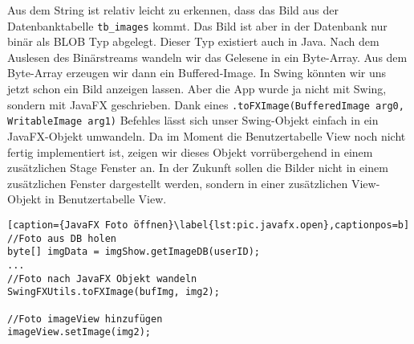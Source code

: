Aus dem String ist relativ leicht zu erkennen, dass das Bild aus der Datenbanktabelle \texttt{tb\_images} kommt. Das Bild ist aber in der Datenbank nur binär als BLOB Typ abgelegt. Dieser Typ existiert auch in Java. Nach dem Auslesen des Binärstreams wandeln wir das Gelesene in ein Byte-Array. Aus dem Byte-Array erzeugen wir dann ein Buffered-Image. In Swing könnten wir uns jetzt schon ein Bild anzeigen lassen. Aber die App wurde ja nicht mit Swing, sondern mit JavaFX geschrieben. Dank eines \texttt{.toFXImage(BufferedImage arg0, WritableImage arg1)} Befehles lässt sich unser Swing-Objekt einfach in ein JavaFX-Objekt umwandeln. Da im Moment die Benutzertabelle View noch nicht fertig implementiert ist, zeigen wir dieses Objekt vorrübergehend in einem zusätzlichen Stage Fenster an. In der Zukunft sollen die Bilder nicht in einem zusätzlichen Fenster dargestellt werden, sondern in einer zusätzlichen View-Objekt in Benutzertabelle View. %
\begin{lstlisting}[caption={JavaFX Foto öffnen}\label{lst:pic.javafx.open},captionpos=b]
//Foto aus DB holen
byte[] imgData = imgShow.getImageDB(userID);
...
//Foto nach JavaFX Objekt wandeln
SwingFXUtils.toFXImage(bufImg, img2);

//Foto imageView hinzufügen
imageView.setImage(img2);
\end{lstlisting}

